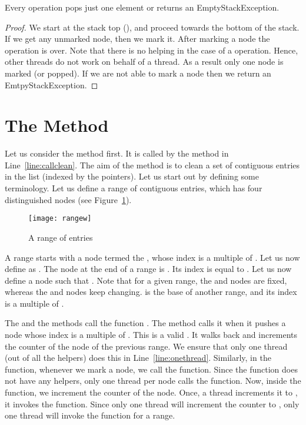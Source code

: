 \documentclass{llncs}
\begin{document}
\begin{appendix}
\begin{lemma}
Every  operation pops just one element or returns an EmptyStackException.
\label{lemm:poponce}
\end{lemma}

\begin{proof}
We start at the stack top (), and proceed towards the
bottom of the stack. If we get any unmarked node, then we mark it. After marking a node
the  operation is over. Note that there is no helping in the case of a  
operation. Hence, other threads do not work on behalf of a thread. As a result only
one node is marked (or popped). If we are not able to mark a node then we return
an EmtpyStackException. 
\end{proof}

\section{The  Method}




Let us consider the  method first. It is called by the  method in Line~\ref{line:callclean}.
The aim of the  method is to clean a set of  contiguous entries in the list (indexed by 
the  pointers). Let us start out by defining some terminology. Let us define a range of  
contiguous entries, which has
four distinguished nodes (see Figure~\ref{fig:rangewa}).

\begin{figure}[!htb]
\begin{center}
\texttt{[image: rangew]}
\caption{A range of  entries \label{fig:rangewa} }
\end{center}
\end{figure}

A range starts with a node termed the , whose index is a multiple of . Let us now define
 as . The node at the end of a range is . Its index is equal to 
. Let us now define a node  such that . 
Note that for a given range, the  and  nodes are fixed, whereas the  and
 nodes keep changing.  is the base of another range, and its index is
a multiple of . 

The  and the  methods call the function . The  method calls it when
it pushes a node whose index is a multiple of . This is a valid . It walks back 
and increments the counter of the  node of the previous range. We ensure that only one thread
(out of all the helpers) does this in Line~\ref{line:onethread}. Similarly, in the  function,
whenever we mark a node, we call the  function. Since the  function does not
have any helpers, only one thread per node calls the  function. Now, inside
the  function, we increment the counter of the  node. Once, a thread increments it to
 ,
it invokes the  function. Since only one thread will increment the counter to , only one thread
will invoke the  function for a range. 




\end{appendix}
\end{document}
